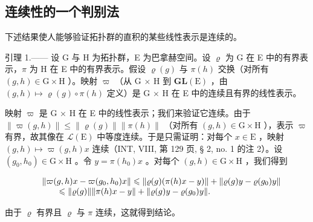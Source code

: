 \subsection{连续性的一个判别法}

下述结果使人能够验证拓扑群的直积的某些线性表示是连续的。

引理 1.—— 设 G 与 H 为拓扑群，E 为巴拿赫空间。设 \(\varrho\) 为 G 在 E 中的有界表示，\(\pi\) 为 H 在 E 中的有界表示。假设 \(\varrho(g)\) 与 \(\pi(h)\) 交换（对所有 \((g,h)\in\mathrm{G}\times\mathrm{H}\) ）。映射 \(\varpi\) （从 G \(\times\) H 到 \(\mathbf{GL}(\mathrm{E})\) ，由 \((g,h)\mapsto\varrho(g)\circ\pi(h)\) 定义）是 G \(\times\) H 在 E 中的连续且有界的线性表示。

映射 \(\varpi\) 是 G × H 在 E 中的线性表示；我们来验证它连续。由于 \(\| \varpi(g, h) \| \leqslant \| \varrho(g) \| \| \pi(h) \|\) （对所有 \((g, h) \in \mathrm{G} \times \mathrm{H}\) ），表示 \(\varpi\) 有界，故其像在 \(\mathcal{L}(\mathrm{E})\) 中等度连续。于是只需证明：对每个 \(x \in \mathrm{E}\) ，映射 \((g, h) \mapsto \varpi(g, h)x\) 连续（INT, VIII, 第 129 页, § 2, no. 1 的注 2）。设 \((g_0, h_0) \in \mathrm{G} \times \mathrm{H}\) 。令 \(y = \pi(h_0)x\) 。对每个 \((g, h) \in \mathrm{G} \times \mathrm{H}\) ，我们得到

\[
\begin{array}{r l} & {\| \varpi (g, h) x - \varpi (g _ {0}, h _ {0}) x \| \leqslant \| \varrho (g) (\pi (h) x - y) \| + \| \varrho (g) y - \varrho (g _ {0}) y \|} \\ & {\qquad \leqslant \| \varrho (g) \| \| \pi (h) x - y \| + \| \varrho (g) y - \varrho (g _ {0}) y \|.} \end{array}
\]

由于 \(\varrho\) 有界且 \(\varrho\) 与 \(\pi\) 连续，这就得到结论。
\relax{}
